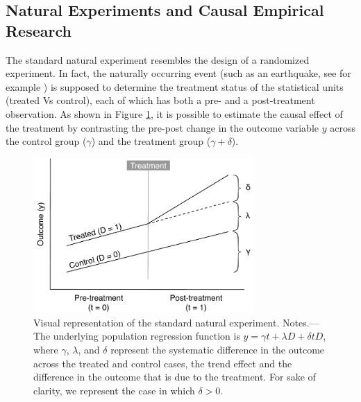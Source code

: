 \documentclass[nobib]{tufte-handout}
\begin{document}
\begin{refsection}
\section{Natural Experiments and Causal Empirical Research}
\label{sec:standard_ne}


The standard natural experiment resembles the
design of a randomized experiment. In fact, the naturally occurring event (such
as an earthquake, see for example \cite[][]{Belloc2016}) is supposed
to determine the treatment status of the statistical units (treated Vs control),
each of which has both a pre- and a post-treatment observation. As shown in
Figure \ref{fig:ne_logic_viz}, it is possible to estimate the causal effect of the treatment by
contrasting the pre-post change in the outcome variable $y$ across
the control group ($\gamma$) and the treatment group 
($ \gamma + \delta$).

\begin{figure}[]
    \centering
    \includegraphics[width=0.75\textwidth]{exhibits/ne_logic_viz.pdf}
    \caption{Visual representation of the standard natural experiment. Notes.---
        The underlying population regression function is $y = \gamma t +
        \lambda D + \delta t D$, where $\gamma$, $\lambda$, and $\delta$ represent 
        the systematic difference in the outcome across the treated and control 
        cases, the trend effect and the difference in the outcome that is due to
        the treatment. For sake of clarity, we represent the case in which
        $\delta > 0$.}
    \label{fig:ne_logic_viz}
\end{figure}


\end{refsection}
\end{document}
